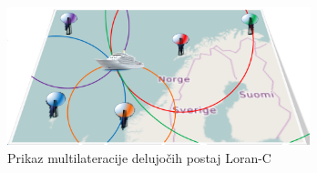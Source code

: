 
\begin{figure}[!ht]
	\begin{center}
		\includegraphics[height=4cm]{Predavanja/04_ZemeljLastPolozaj/figs/LoranstationsEuropeDetDetSign_20160925.png}  
		\caption{Prikaz multilateracije delujočih postaj Loran-C}\label{Fig_MultiLoranC}
	\end{center}
\end{figure}





